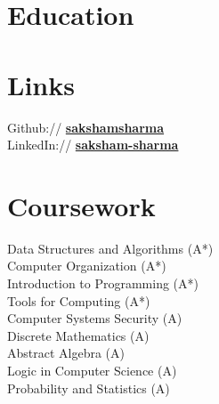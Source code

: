 \documentclass[a4paper]{deedy-resume} %
\begin{document}

\begin{minipage}[t]{0.33\textwidth} %

  \section{Education} 



  \sectionspace
  \sectionspace
  \sectionspace


  \sectionspace

  \section{Links} 

  Github:// \href{https://github.com/sakshamsharma}{\bf sakshamsharma} \\
  LinkedIn:// \href{https://www.linkedin.com/in/sakshamsharma}{\bf saksham-sharma} \\

  \sectionspace

  \section{Coursework}
  Data Structures and Algorithms (A*)\\
  Computer Organization (A*)\\
  Introduction to Programming (A*)\\
  Tools for Computing (A*)\\
  Computer Systems Security (A)\\
  Discrete Mathematics (A)\\
  Abstract Algebra (A)\\
  Logic in Computer Science (A)\\
  Probability and Statistics (A)\\


\end{minipage}
\end{document}
